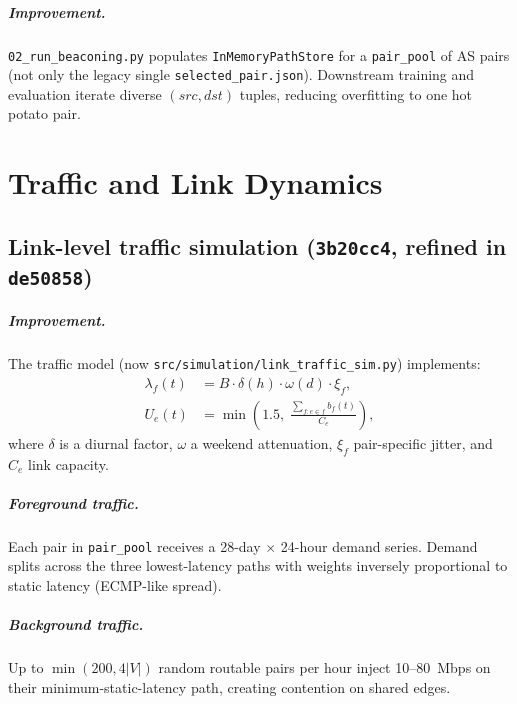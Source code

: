 \documentclass[11pt,a4paper,twoside,openright]{report}
\begin{document}
\paragraph{Improvement.}
\texttt{02\_run\_beaconing.py} populates \texttt{InMemoryPathStore} for a
\texttt{pair\_pool} of AS pairs (not only the legacy single
\texttt{selected\_pair.json}).
Downstream training and evaluation iterate diverse $(src,dst)$ tuples, reducing
overfitting to one hot potato pair.

\chapter{Traffic and Link Dynamics}

\section{Link-level traffic simulation (\texttt{3b20cc4}, refined in \texttt{de50858})}

\paragraph{Improvement.}
The traffic model (now \texttt{src/simulation/link\_traffic\_sim.py}) implements:
\begin{align}
  \lambda_{f}(t) &= B \cdot \delta(h) \cdot \omega(d) \cdot \xi_f, \\
  U_e(t) &= \min\!\left(1.5,\; \frac{\sum_{f: e \in f} b_f(t)}{C_e}\right),
\end{align}
where $\delta$ is a diurnal factor, $\omega$ a weekend attenuation, $\xi_f$ pair-specific
jitter, and $C_e$ link capacity.

\paragraph{Foreground traffic.}
Each pair in \texttt{pair\_pool} receives a 28-day $\times$ 24-hour demand series.
Demand splits across the three lowest-latency paths with weights inversely proportional
to static latency (ECMP-like spread).

\paragraph{Background traffic.}
Up to $\min(200, 4|V|)$ random routable pairs per hour inject 10--80~Mbps on their
minimum-static-latency path, creating contention on shared edges.
\end{document}
